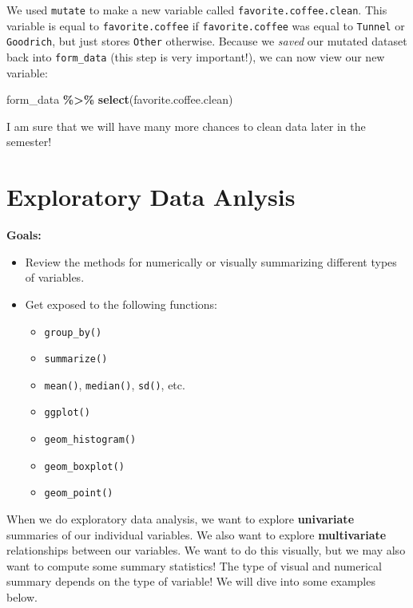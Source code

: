 \documentclass[
]{article}
\newenvironment{Shaded}{\begin{snugshade}}{\end{snugshade}}
\newcommand{\FunctionTok}[1]{\textcolor[rgb]{0.13,0.29,0.53}{\textbf{#1}}}
\newcommand{\NormalTok}[1]{#1}
\newcommand{\SpecialCharTok}[1]{\textcolor[rgb]{0.81,0.36,0.00}{\textbf{#1}}}
\providecommand{\tightlist}{%
  \setlength{\itemsep}{0pt}\setlength{\parskip}{0pt}}
\begin{document}
We used \texttt{mutate} to make a new variable called
\texttt{favorite.coffee.clean}. This variable is equal to
\texttt{favorite.coffee} if \texttt{favorite.coffee} was equal to
\texttt{Tunnel} or \texttt{Goodrich}, but just stores \texttt{Other}
otherwise. Because we \emph{saved} our mutated dataset back into
\texttt{form\_data} (this step is very important!), we can now view our
new variable:

\begin{Shaded}
\begin{Highlighting}[]
\NormalTok{form\_data }\SpecialCharTok{\%\textgreater{}\%} \FunctionTok{select}\NormalTok{(favorite.coffee.clean)}
\end{Highlighting}
\end{Shaded}

I am sure that we will have many more chances to clean data later in the
semester!

\section{Exploratory Data Anlysis}\label{exploratory-data-anlysis}

\label{boxedtext}
\textbf{Goals:}

\begin{itemize}
\item
  Review the methods for numerically or visually summarizing different
  types of variables.
\item
  Get exposed to the following functions:

  \begin{itemize}
  \tightlist
  \item
    \texttt{group\_by()}
  \item
    \texttt{summarize()}
  \item
    \texttt{mean()}, \texttt{median()}, \texttt{sd()}, etc.
  \item
    \texttt{ggplot()}
  \item
    \texttt{geom\_histogram()}
  \item
    \texttt{geom\_boxplot()}
  \item
    \texttt{geom\_point()}
  \end{itemize}
\end{itemize}

When we do exploratory data analysis, we want to explore
\textbf{univariate} summaries of our individual variables. We also want
to explore \textbf{multivariate} relationships between our variables. We
want to do this visually, but we may also want to compute some summary
statistics! The type of visual and numerical summary depends on the type
of variable! We will dive into some examples below.
\end{document}
